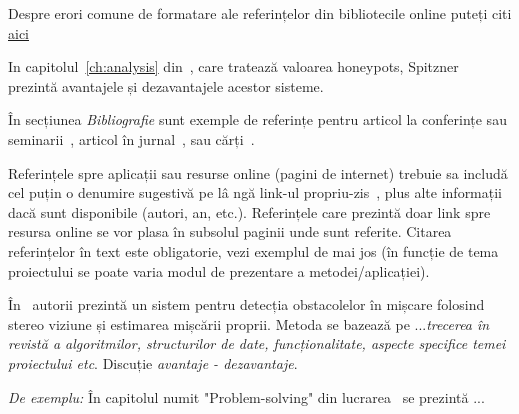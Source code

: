 Despre erori comune de formatare ale referințelor din bibliotecile online puteți citi \href{https://www.ece.ucdavis.edu/~jowens/biberrors.html}{aici}


In capitolul~\ref{ch:analysis} din~\cite{strunk}, care tratează valoarea honeypots, Spitzner prezintă avantajele și dezavantajele acestor sisteme.


În secțiunea \textit{Bibliografie} sunt exemple de referințe pentru articol la conferințe sau seminarii~\cite{BellucciLZ04}, articol în jurnal~\cite{AntoniouSBDB07},
sau cărți~\cite{russell1995artificial}.


Referințele spre aplicații sau resurse online (pagini de internet) trebuie sa includă cel puțin o denumire sugestivă pe lâ ngă link-ul propriu-zis~\cite{webpage},
plus alte informații dacă sunt disponibile (autori, an, etc.).
Referințele care prezintă doar link spre resursa online se vor plasa în subsolul paginii unde sunt referite.
Citarea referințelor în text este obligatorie, vezi exemplul de mai jos (în funcție de tema proiectului se poate varia modul de prezentare a metodei/aplicației).

În~\cite{AntoniouSBDB07} autorii prezintă un sistem pentru detecția obstacolelor în mișcare folosind stereo viziune și estimarea mișcării proprii.
Metoda se bazează pe ...{\it trecerea în revistă a algoritmilor, structurilor de date, funcționalitate, aspecte specifice temei proiectului etc}. Discuție {\it avantaje - dezavantaje}.


\textit{De exemplu:} În capitolul numit "Problem-solving" din lucrarea~\cite{russell1995artificial} se prezintă ...

